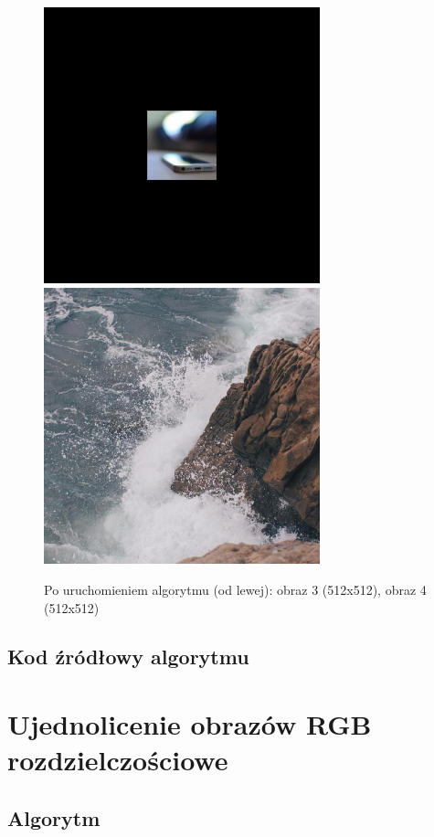 \documentclass[a4paper,12pt]{book}
\begin{document}
\begin{figure}[H]
	\caption{Po uruchomieniem algorytmu (od lewej): obraz 3 (512x512), obraz 4 (512x512)}
	\includegraphics[width=8cm, height=8cm]{1-3/geometric-color-phone-sea.png}
	\includegraphics[width=8cm, height=8cm]{1-3/geometric-color-sea-phone.png}
\end{figure}

\subsection*{Kod źródłowy algorytmu}

\section{Ujednolicenie obrazów RGB rozdzielczościowe}
\subsection*{Algorytm}
\end{document}
